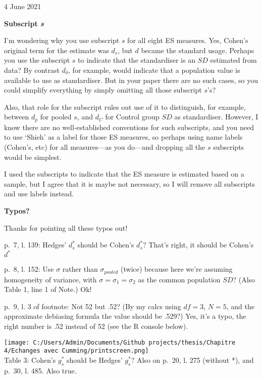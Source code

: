 \documentclass[
  12pt,
  french,
]{article}
\begin{document}
4 June 2021

\textbf{Subscript \emph{s}}

I'm wondering why you use subscript \(s\) for all eight ES measures.
Yes, Cohen's original term for the estimate was \(d_s\), but \(d\)
became the standard usage. Perhaps you use the subscript \(s\) to
indicate that the standardiser is an \(SD\) estimated from data? By
contrast \(d_\delta\), for example, would indicate that a population
value is available to use as standardiser. But in your paper there are
no such cases, so you could simplify everything by simply omitting all
those subscript \(s’\)s?

Also, that role for the subscript rules out use of it to distinguish,
for example, between \(d_p\) for pooled \(s\), and \(d_C\) for Control
group \(SD\) as standardiser. However, I know there are no
well-established conventions for such subscripts, and you need to use
`Shieh' as a label for those ES measures, so perhaps using name labels
(Cohen's, etc) for all measures---as you do---and dropping all the \(s\)
subscripts would be simplest.

\color{blue} I used the subscripts to indicate that the ES measure is
estimated based on a sample, but I agree that it is maybe not necessary,
so I will remove all subscripts and use labels instead.

\color{black} \textbf{Typos?}

\color{blue} Thanks for pointing all these typos out!

\color{black} p.~7, l. 139: Hedges' \(d_s^*\) should be Cohen's
\(d_s^*\)? \color{blue}That's right, it should be Cohen's \(d^*\)

\color{black} p.~8, l. 152: Use \(\sigma\) rather than
\(\sigma_{pooled}\) (twice) because here we're assuming homogeneity of
variance, with \(\sigma = \sigma_1 = \sigma_2\) as the common population
\(SD\)? (Also Table 1, line 1 of Note.) \color{blue} \color{blue}Ok!

\color{black} p.~9, l. 3 of footnote: Not 52 but .52? (By my calcs using
\(df = 3\), \(N = 5\), and the approximate debiasing formula the value
should be .529?) \color{blue} Yes, it's a typo, the right number is .52
instead of 52 (see the R console below).

\texttt{[image: C:/Users/Admin/Documents/Github projects/thesis/Chapitre 4/Echanges avec Cumming/printscreen.png]}\\
\color{black} Table 3: Cohen's \(g_s^*\) should be Hedges' \(g_s^*\)?
Also on p.~20, l. 275 (without *), and p.~30, l. 485. \color{blue} Also
true.
\end{document}
